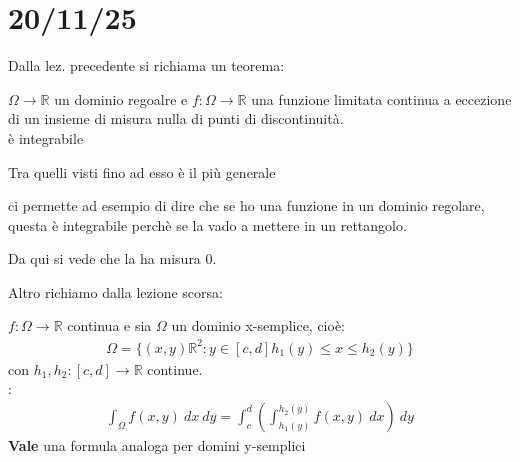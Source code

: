 \documentclass[a4paper, oneside]{article}
\begin{document}
\section{20/11/25}
Dalla lez. precedente si richiama un teorema:
\begin{theorem}
     $\Omega \to \mathbb{R}$ un dominio regoalre e $f:\Omega \to \mathbb{R}$ una funzione limitata continua a eccezione di un insieme di misura nulla di punti di discontinuità.\\
     è integrabile
\end{theorem}
Tra quelli visti fino ad esso è il più generale
\begin{example}
    ci permette ad esempio di dire che se ho una funzione in un dominio regolare, questa è integrabile perchè se la vado a mettere in un rettangolo.
    \begin{center}
    \end{center}
    Da qui si vede che la ha misura 0.
\end{example}
Altro richiamo dalla lezione scorsa:
\begin{theorem}
     $f:\Omega \to \mathbb{R}$ continua e sia $\Omega$ un dominio x-semplice, cioè:
    \begin{gather*}
        \Omega = \{ (x,y) \mathbb{R}^2: y \in[c,d] h_1(y) \leq x \leq h_2(y)\}
    \end{gather*}
    con $h_1,h_2:[c,d] \to \mathbb{R}$ continue.\\
    :
    \begin{gather*}
        \int_{\Omega} f(x,y) \ dx \ dy = \int_{c}^{d} \left( \int_{h_1(y)}^{h_2(y)} f(x,y) \ dx \right) \ dy 
    \end{gather*}
\textbf{Vale} una formula analoga per domini y-semplici
\end{theorem}
\end{document}

